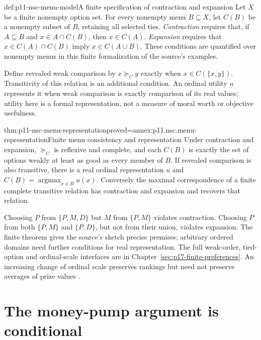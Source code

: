 \begin{hbdefinition}{def:p11-nsc-menu-model}{A finite specification of contraction and expansion}
Let \(X\) be a finite nonempty option set. For every nonempty menu
\(B\subseteq X\), let \(C(B)\) be a nonempty subset of \(B\),
retaining all selected ties. \emph{Contraction} requires that, if
\(A\subseteq B\) and \(x\in A\cap C(B)\), then \(x\in C(A)\).
\emph{Expansion} requires that \(x\in C(A)\cap C(B)\) imply
\(x\in C(A\cup B)\). These conditions are quantified over nonempty
menus in this finite formalization of the source's examples.

Define revealed weak comparison by
\(x\succeq_C y\) exactly when \(x\in C(\{x,y\})\).
Transitivity of this relation is an additional condition. An ordinal
utility \(u\) represents it when weak comparison is exactly comparison
of its real values; utility here is a formal representation, not a
measure of moral worth or objective usefulness.
\end{hbdefinition}

\begin{hbtheorem}{thm:p11-nsc-menu-representation}{proved=annex:p11.nsc.menu-representation}{Finite menu consistency and representation}
Under contraction and expansion, \(\succeq_C\) is reflexive and complete,
and each \(C(B)\) is exactly the set of options weakly at least as good
as every member of \(B\). If revealed comparison is also transitive,
there is a real ordinal representation \(u\) and
\(C(B)=\operatorname{argmax}_{x\in B}u(x)\).
Conversely the maximal correspondence of a finite complete transitive
relation has contraction and expansion and recovers that relation.
\end{hbtheorem}

Choosing \(P\) from \(\{P,M,D\}\) but \(M\) from \(\{P,M\}\)
violates contraction. Choosing \(P\) from both \(\{P,M\}\) and
\(\{P,D\}\), but not from their union, violates expansion. The
finite theorem gives the source's sketch precise premises; arbitrary
ordered domains need further conditions for real representation.
The full weak-order, tied-option and ordinal-scale interfaces are in
Chapter~\ref{sec:p17-finite-preferences}. An increasing change of ordinal
scale preserves rankings but need not preserve averages of prize values
\cite[pp.~16--17]{ChaterOaksford2012NormativeSystems}.

\section{The money-pump argument is conditional}
\label{sec:p11-nsc-pump}

